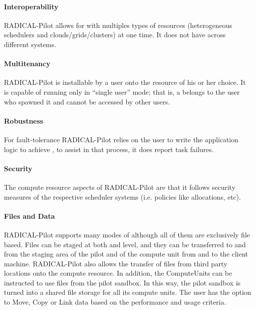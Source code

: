 \documentclass{sig-alternate}
\begin{document}
\paragraph{Interoperability}

RADICAL-Pilot allows for  with multiples types of
resources (heterogeneous schedulers and clouds/grids/clusters) at one time. It
does not have  across different \pilot systems.

\paragraph{Multitenancy}

RADICAL-Pilot is installable by a user onto the resource of his or her choice.
It is capable of running only in ``single user'' mode; that is, a \pilot
belongs to the user who spawned it and cannot be accessed by other users.

\paragraph{Robustness}

For fault-tolerance RADICAL-Pilot relies on the user to write the application
logic to achieve , to assist in that process, it does report
task failures.

\paragraph{Security}

The compute resource  aspects of RADICAL-Pilot are that it
follows security measures of the respective scheduler systems (i.e. policies
like allocations, etc).

\paragraph{Files and Data}

RADICAL-Pilot supports many modes of  although all of
them are exclusively file based. Files can be staged at both \pilot and
 level, and they can be transferred to and from the
staging area of the pilot and of the compute unit  from and to
the client machine. RADICAL-Pilot also allows the transfer of files from third
party locations onto the compute resource. In addition, the ComputeUnits can be
instructed to use files from the pilot sandbox. In this way, the pilot sandbox
is turned into a shared file storage for all its compute units. The user has
the option to Move, Copy or Link data based on the performance and usage
criteria.
\end{document}
